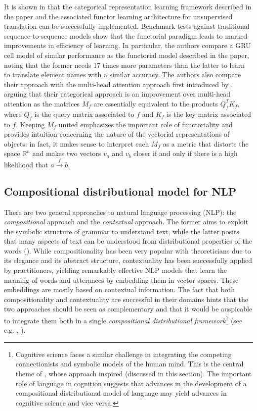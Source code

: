 \documentclass[11pt,a4paper,openright,twoside]{report}
\theoremstyle{plain}
\theoremstyle{definition}
\begin{document}
It is shown in \cite{sheshmani2021categorical} that the categorical representation learning framework described in the paper and the associated functor learning architecture for unsupervised translation can be successfully implemented. Benchmark tests against traditional sequence-to-sequence models show that the functorial paradigm leads to marked improvements in efficiency of learning. In particular, the authors compare a GRU cell model of similar performance as the functorial model described in the paper, noting that the former needs 17 times more parameters than the latter to learn to translate element names with a similar accuracy. The authors also compare their approach with the multi-head attention approach first introduced by \cite{vaswani2017attention}, arguing that their categorical approach is an improvement over multi-head attention as the matrices $M_f$ are essentially equivalent to the products $Q_f^TK_f$, where $Q_f$ is the query matrix associated to $f$ and $K_f$ is the key matrix associated to $f$. Keeping $M_f$ united emphasizes the important role of functoriality and provides intuition concerning the nature of the vectorial representations of objects: in fact, it makes sense to interpret each $M_f$ as a metric that distorts the space $\mathbb{R}^n$ and makes two vectors $v_a$ and $v_b$ closer if and only if there is a high likelihood that $a \stackrel{f}{\longrightarrow} b$.



\subsection{Compositional distributional model for NLP}

There are two general approaches to natural language processing (NLP): the \textit{compositional} approach and the \textit{contextual} approach. The former aims to exploit the symbolic structure of grammar to understand text, while the latter posits that many aspects of text can be understood from distributional properties of the words (\cite{amigo2022information}). While compositionality has been very popular with theoreticians due to its elegance and its abstract structure, contextuality has been successfully applied by practitioners, yielding remarkably effective NLP models that learn the meaning of words and utterances by embedding them in vector spaces. These embeddings are mostly based on contextual information. The fact that both compositionality and contextuality are successful in their domains hints that the two approaches should be seen as complementary and that it would be auspicable to integrate them both in a single \textit{compositional distributional framework}\footnote{Cognitive science faces a similar challenge in integrating the competing connectionists and symbolic models of the human mind. This is the central theme of \cite{smolensky2006harmonic}, whose approach inspired \cite{clark2007combining} (discussed in this section). The important role of language in cognition suggests that advances in the development of a compositional distributional model of language may yield advances in cognitive science and vice versa.} (see e.g. \cite{amigo2022information}, \cite{maruyama2019compositionality}). 
\end{document}
